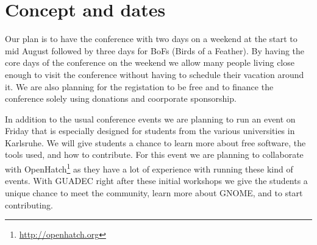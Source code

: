 
\newpage




\begin{tikzpicture}
\end{tikzpicture}

\vspace*{8.5cm}

\section{Concept and dates}

Our plan is to have the conference with two days on a weekend at the start to mid
August followed by three days for BoFs (Birds of a Feather). By having the core
days of the conference on the weekend we allow many people living close enough to visit
the conference without having to schedule their vacation around it. We are also
planning for the registation to be free and to finance the conference solely
using donations and coorporate sponsorship.

In addition to the usual conference events we are planning to run an event
on Friday that is especially designed for students from the various universities
in Karlsruhe. We will give students a chance to learn more about free software,
the tools used, and how to contribute. For this event we are planning to collaborate with
OpenHatch\footnote{\url{http://openhatch.org}} as they have a lot of experience
with running these kind of events. With GUADEC right after these initial workshops
we give the students a unique chance to meet the community, learn more about GNOME,
and to start contributing.

